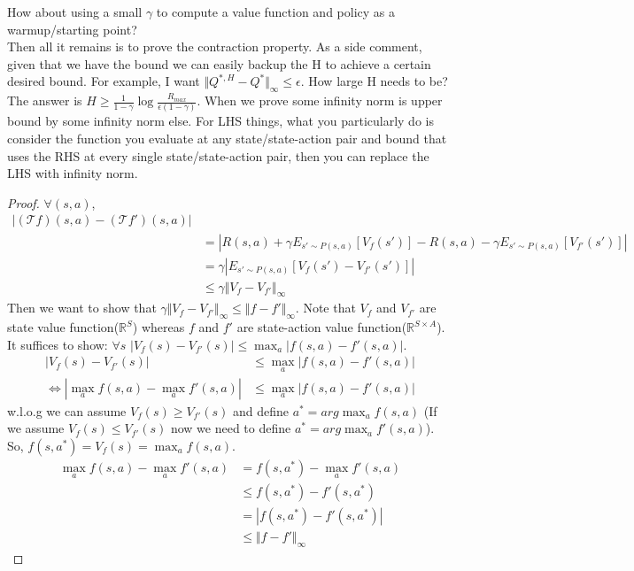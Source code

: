 \documentclass{report}
\begin{document}
How about using a small $\gamma$ to compute a value function and policy as a warmup/starting point?\\
Then all it remains is to prove the contraction property. As a side comment, given that we have the bound we can easily backup the H to achieve a certain desired bound. For example, I want $\Vert Q^{*, H}-Q^{*}\Vert_{\infty} \leq \epsilon$. How large H needs to be? The answer is $H \geq \frac{1}{1-\gamma} \log{\frac{R_{max}}{\epsilon(1-\gamma)}}$.
When we prove some infinity norm is upper bound by some infinity norm else. For LHS things, what you particularly do is consider the function you evaluate at any state/state-action pair and bound that uses the RHS at every single state/state-action pair, then you can replace the LHS with infinity norm.
\begin{proof}
   $\forall (s,a)$, 
   \begin{equation*}
   \begin{split}
    |(\mathcal{T}f)(s,a)-(\mathcal{T}f')(s,a)|&\\
       &=   |R(s,a)+\gamma E_{s'\sim P(s,a)}[V_f(s')]-R(s,a)-\gamma E_{s'\sim P(s,a)}[V_{f'}(s')]|\\
       &= \gamma |E_{s'\sim P(s,a)}[V_f(s')-V_{f'}(s')]|\\
       & \leq \gamma \Vert V_f-V_{f'}\Vert_{\infty}
   \end{split}
   \end{equation*}
   Then we want to show that $\gamma \Vert V_f-V_{f'}\Vert_{\infty} \leq \Vert f-f'\Vert_{\infty}$. Note that $V_f$ and $V_{f'}$ are state value function($\mathbb{R}^{S}$) whereas  $f$ and $f'
   $ are state-action value function($\mathbb{R}^{S\times A}$).\\
    It suffices to show: $\forall s$ $|V_f(s)-V_{f'}(s)| \leq \max_{a} |f(s,a)-f'(s,a)|$.
    \begin{equation*}
        \begin{split}
            |V_f(s)-V_{f'}(s)| &\leq \max_{a} |f(s,a)-f'(s,a)| \\
            \Leftrightarrow |\max_{a}f(s,a)-\max_{a}f'(s,a)| &\leq \max_{a} |f(s,a)-f'(s,a)|
        \end{split}
    \end{equation*}
    w.l.o.g we can assume $V_f(s) \geq V_{f'}(s)$ and define $a^*=arg\max_{a}f(s,a)$ (If we assume $V_f(s) \leq V_{f'}(s)$ now we need to define $a^*=arg\max_{a}f'(s,a)$). So, $f(s,a^*)=V_f(s)=\max_{a}f(s,a)$. 
   \begin{equation*}
       \begin{split}
           \max_{a}f(s,a)-\max_{a}f'(s,a) &= f(s,a^*)-\max_{a}f'(s,a) \\
           &\leq  f(s,a^*)-f'(s,a^*) \\
           &= |f(s,a^*)-f'(s,a^*)|\\
           &\leq \Vert f-f'\Vert_{\infty}
       \end{split}
   \end{equation*}
\end{proof}
\end{document}
